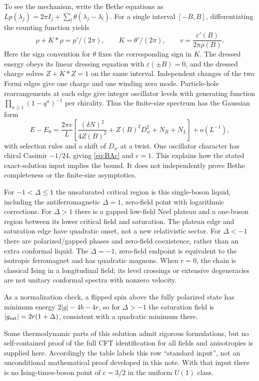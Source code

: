 \documentclass[11pt]{article}
\begin{document}
To see the mechanism, write the Bethe equations as
$Lp(\lambda_j)=2\pi I_j+\sum_l\theta(\lambda_j-\lambda_l)$.
For a single interval $[-B,B]$, differentiating the counting function yields
\begin{equation}
 \rho+K*\rho=p'/(2\pi),\qquad K=\theta'/(2\pi),
 \qquad v=\frac{\varepsilon'(B)}{2\pi\rho(B)}.
\end{equation}
Here the sign convention for $\theta$ fixes the corresponding sign in $K$.
The dressed energy obeys its linear dressing equation with
$\varepsilon(\pm B)=0$, and the dressed charge solves $Z+K*Z=1$ on the same
interval. Independent changes of the two Fermi edges give one charge and
one winding zero mode. Particle-hole rearrangements at each edge give
integer oscillator levels with generating function
$\prod_{n\ge1}(1-q^n)^{-1}$ per chirality. Thus the finite-size spectrum has
the Gaussian form
\begin{equation}
 E-E_0=\frac{2\pi v}{L}\left[
 \frac{(\delta N)^2}{4Z(B)^2}+Z(B)^2D_w^2+N_R+N_L\right]+o(L^{-1}),
\end{equation}
with selection rules and a shift of $D_w$ at a twist. One oscillator character
has chiral Casimir $-1/24$, giving \eqref{eq:BAc} and $c=1$.
This explains how the stated exact-solution input implies the bound. It does
not independently prove Bethe completeness or the finite-size asymptotics.

For $-1<\Delta\le1$ the unsaturated critical region is this single-boson
liquid, including the antiferromagnetic $\Delta=1$, zero-field point with
logarithmic corrections. For $\Delta>1$ there is a gapped low-field Neel
plateau and a one-boson region between its lower critical field and saturation.
The plateau edge and saturation edge have quadratic onset, not a new
relativistic sector. For $\Delta<-1$ there are polarized/gapped phases and
zero-field coexistence, rather than an extra conformal liquid. The
$\Delta=-1$, zero-field endpoint is equivalent to the isotropic ferromagnet
and has quadratic magnons. When $r=0$, the chain is classical Ising in a
longitudinal field; its level crossings or extensive degeneracies are not
unitary conformal spectra with nonzero velocity.

As a normalization check, a flipped spin above the fully polarized state has
minimum energy $2|g|-4b-4r$, so for $\Delta>-1$ the saturation field is
$|g_{\rm sat}|=2r(1+\Delta)$, consistent with a quadratic minimum there.

Some thermodynamic parts of this solution admit rigorous formulations, but
no self-contained proof of the full CFT identification for all fields and
anisotropies is supplied here. Accordingly the table labels this row
``standard input'', not an unconditional mathematical proof developed in
this note. With that input there is no Ising-times-boson point of $c=3/2$ in
the uniform $U(1)$ class.
\end{document}

